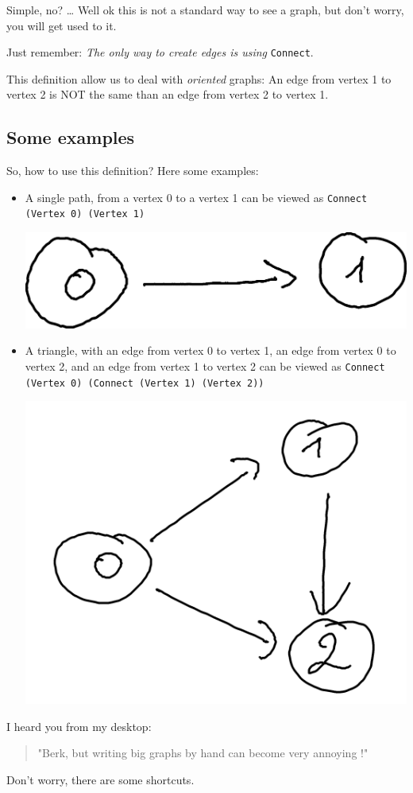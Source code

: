 \documentclass[10pt,a4paper]{article}
\begin{document}
Simple, no?
\ldots
Well ok this is not a standard way to see a graph, but don't worry, you will get used to it.

Just remember: \emph{The only way to create edges is using} \verb|Connect|.

This definition allow us to deal with \emph{oriented} graphs: An edge from vertex 1 to vertex 2 is NOT the same than an edge from vertex 2 to vertex 1.

\subsection{Some examples}

So, how to use this definition? Here some examples:

\begin{itemize}
	\item A single path, from a vertex 0 to a vertex 1 can be viewed as \verb|Connect (Vertex 0) (Vertex 1)| 
	\begin{center}
	\includegraphics[scale=0.5]{figspng/e2.png}
	\end{center}
	\item A triangle, with an edge from vertex 0 to vertex 1, an edge from vertex 0 to vertex 2, and an edge from vertex 1 to vertex 2 can be viewed as  \verb|Connect (Vertex 0) (Connect (Vertex 1) (Vertex 2))| 
	\begin{center}
	\includegraphics[scale=0.5]{figspng/e1.png}
	\end{center}

\end{itemize}
I heard you from my desktop:
\begin{quote}
	"Berk, but writing big graphs by hand can become very annoying !"
\end{quote}
Don't worry, there are some shortcuts.
\end{document}
